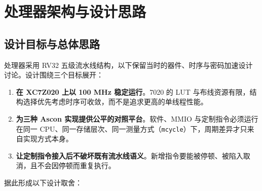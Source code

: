 \section{处理器架构与设计思路}

\Needspace{85pt}

\subsection{设计目标与总体思路}

处理器采用 RV32 五级流水线结构，以下保留当时的器件、时序与密码加速设计讨论。设计围绕三个目标展开：

\begin{enumerate}
\def\labelenumi{\arabic{enumi}.}
\tightlist
\item
  \textbf{在 XC7Z020 上以 100 MHz 稳定运行}。7020 的 LUT 与布线资源有限，结构选择优先考虑时序可收敛，而不是追求更高的单线程性能。
\item
  \textbf{为三种 Ascon 实现提供公平的对照平台}。软件、MMIO 与定制指令必须运行在同一 CPU、同一存储层次、同一测量方式（\texttt{mcycle}）下，周期差异才只来自实现方式本身。
\item
  \textbf{让定制指令接入后不破坏既有流水线语义}。新增指令要能被停顿、被陷入取消，且不会因停顿而重复执行。
\end{enumerate}

据此形成以下设计取舍：

